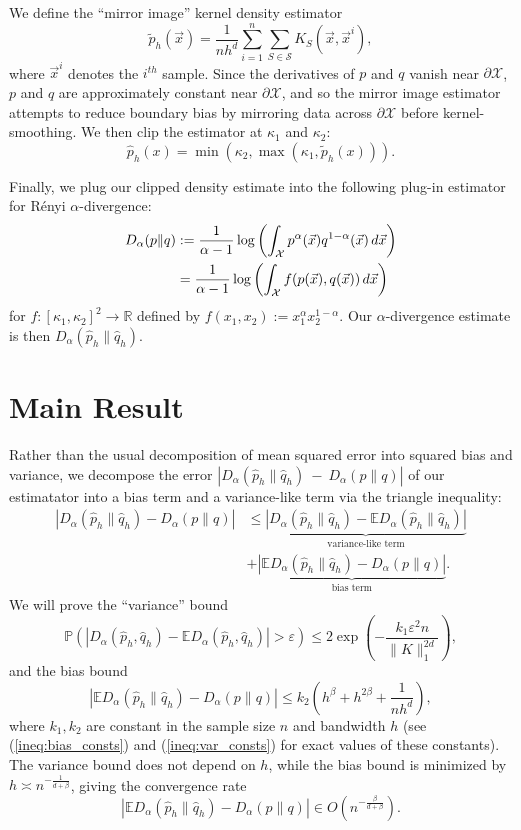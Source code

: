 \documentclass{article}
\newcommand{\R}{\mathbb{R}}                         %
\newcommand{\Se}{\mathcal{S}}                       %
\newcommand{\e}{\varepsilon}                        %
\newcommand{\X}{\mathcal{X}}                        %
\newcommand{\E}{\mathbb{E}}                         %
\newcommand{\pr}{\mathbb{P}}                        %
\newcommand{\cpest}{\widehat{p}_h}                  %
\newcommand{\cqest}{\widehat{q}_h}                  %
\newcommand{\pest}{\widetilde{p}_h}                 %
\newcommand{\vx}{\vec{x}}                           %
\begin{document}
We define the ``mirror image'' kernel density estimator
\[\pest(\vx) = \frac{1}{nh^d} \sum_{i = 1}^n \sum_{S\in \Se} K_S(\vx,\vx^i),\]
where $\vx^i$ denotes the $i^{th}$ sample.
Since the derivatives of $p$ and $q$ vanish near $\partial \X$, $p$ and $q$ are
approximately constant near $\partial \X$, and so the mirror image estimator
attempts to reduce boundary bias by mirroring data across $\partial \X$ before
kernel-smoothing. We then clip the estimator at $\kappa_1$ and $\kappa_2$:
\[\cpest(x) = \min(\kappa_2,\max(\kappa_1,\pest(x))).\]

Finally, we plug our clipped density estimate into the following plug-in
estimator for R\'enyi $\alpha$-divergence:
\begin{align}
\label{def:pluginest}
D_\alpha(p \| q)
 &  := \frac{1}{\alpha - 1}
        \log\left( \int_\X p^\alpha(\vx)q^{1 - \alpha}(\vx) \, d\vx \right)
        \notag \\
 &  = \frac{1}{\alpha - 1}
        \log\left( \int_\X f(p(\vx),q(\vx)) \, d\vx \right)
\end{align}
for $f : [\kappa_1,\kappa_2]^2 \to \R$ defined by
$f(x_1,x_2) := x_1^\alpha x_2^{1 - \alpha}$.
Our $\alpha$-divergence estimate is then $D_\alpha(\cpest \| \cqest)$.

\section{Main Result} \label{sec:main-result}
Rather than the usual decomposition of mean squared error into squared bias and
variance, we decompose the error $|D_\alpha(\cpest\|\cqest)~-~D_\alpha(p\| q)|$
of our estimatator into a bias term and a variance-like term via the triangle
inequality:
\begin{align*}
|D_\alpha(\cpest\|\cqest) - D_\alpha(p\| q)|
 &  \leq \underbrace{|D_\alpha(\cpest\|\cqest) - \E D_\alpha(\cpest\|\cqest)|}
        _{\text{variance-like term}}\\
 &  + \underbrace{|\E D_\alpha(\cpest\|\cqest) - D_\alpha(p\| q)|}
        _{\text{bias term}}.
\end{align*}
We will prove the ``variance'' bound
\[\pr \left( |D_\alpha(\cpest,\cqest) - \E D_\alpha(\cpest,\cqest)| > \e \right)
    \leq 2\exp \left( -\frac{k_1\e^2n}{\|K\|_1^{2d}} \right),
\]
and the bias bound
\[|\E D_\alpha(\cpest\|\cqest) - D_\alpha(p\| q)|
    \leq k_2 \left(h^\beta + h^{2\beta} + \frac{1}{nh^d}\right),
\]
where $k_1,k_2$ are constant in the sample size $n$ and bandwidth $h$ (see
(\ref{ineq:bias_consts}) and (\ref{ineq:var_consts}) for exact values of these
constants). The variance bound does not depend on $h$, while the bias bound is
minimized by $h \asymp n^{-\frac{1}{d + \beta}}$, giving the convergence rate
\[|\E D_\alpha(\cpest \| \cqest) - D_\alpha(p \| q)|
    \in O \left( n^{-\frac{\beta}{d + \beta}} \right).\]
\end{document}
